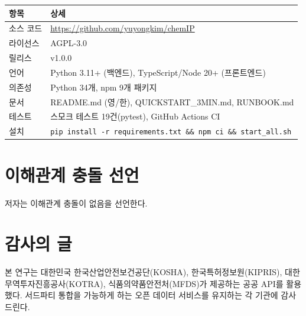 \documentclass[preprint,12pt]{elsarticle}
\begin{document}
\begin{table}[H]
\centering
\begin{tabular}{@{}ll@{}}
\toprule
\textbf{항목} & \textbf{상세} \\
\midrule
소스 코드 & \url{https://github.com/yuyongkim/chemIP} \\
라이선스 & AGPL-3.0 \\
릴리스 & v1.0.0 \\
언어 & Python 3.11+ (백엔드), TypeScript/Node 20+ (프론트엔드) \\
의존성 & Python 34개, npm 9개 패키지 \\
문서 & README.md (영/한), QUICKSTART\_3MIN.md, RUNBOOK.md \\
테스트 & 스모크 테스트 19건(pytest), GitHub Actions CI \\
설치 & \texttt{pip install -r requirements.txt \&\& npm ci \&\& start\_all.sh} \\
\bottomrule
\end{tabular}
\end{table}

\section*{이해관계 충돌 선언}

저자는 이해관계 충돌이 없음을 선언한다.

\section*{감사의 글}

본 연구는 대한민국 한국산업안전보건공단(KOSHA), 한국특허정보원(KIPRIS), 대한무역투자진흥공사(KOTRA), 식품의약품안전처(MFDS)가 제공하는 공공 API를 활용했다. 서드파티 통합을 가능하게 하는 오픈 데이터 서비스를 유지하는 각 기관에 감사드린다.
\end{document}
